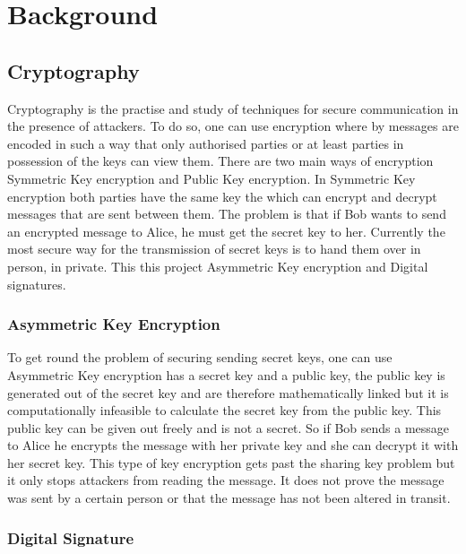 
\chapter{Background}
\label{back}


\section{Cryptography}

Cryptography is the practise and study of techniques for secure communication in the presence of attackers. To do so, one can use encryption where by messages are encoded in such a way that only authorised parties or at least parties in possession of the keys can view them. There are two main ways of encryption Symmetric Key encryption and Public Key encryption. In Symmetric Key encryption both parties have the same key the which can encrypt and decrypt messages that are sent between them. The problem is that if Bob wants to send an encrypted message to Alice, he must get the secret key to her. Currently the most secure way for the transmission of secret keys is to hand them over in person, in private. This this project Asymmetric Key encryption and Digital signatures.


\subsection{Asymmetric Key Encryption}

To get round the problem of securing sending secret keys, one can use Asymmetric Key encryption has a secret key and a public key, the public key is generated out of the secret key and are therefore mathematically linked but it is computationally infeasible to calculate the secret key from the public key. This public key can be given out freely and is not a secret. So if Bob sends a message to Alice he encrypts the message with her private key and she can decrypt it with her secret key. This type of key encryption gets past the sharing key problem but it only stops attackers from reading the message. It does not prove the message was sent by a certain person or that the message has not been altered in transit.


\subsection{Digital Signature}


